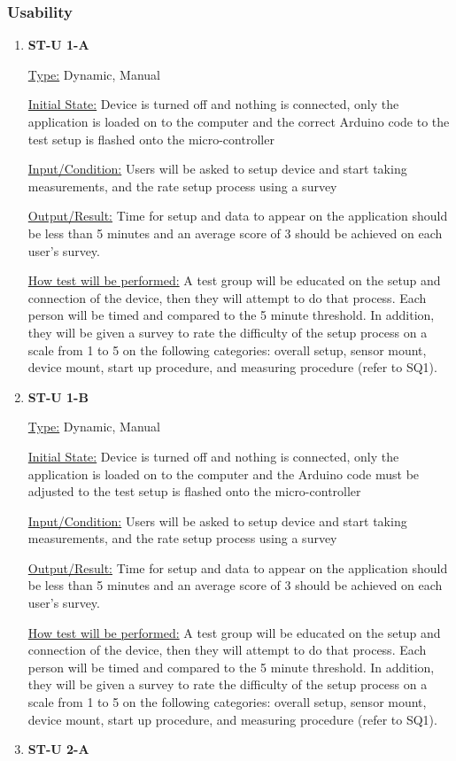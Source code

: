 \documentclass[12pt, titlepage]{article}
\begin{document}
\subsubsection{Usability}

\begin{enumerate}
\item{\bf{ST-U 1-A}}

\underline{Type:} Dynamic, Manual
          
\underline{Initial State:} Device is turned off and nothing is connected, only the application is loaded on to the computer and the correct Arduino code to the test setup is flashed onto the micro-controller
          
\underline{Input/Condition:} Users will be asked to setup device and start taking measurements, and the rate setup process using a survey
          
\underline{Output/Result:} Time for setup and data to appear on the application should be less than 5 minutes and an average score of 3 should be achieved on each user's survey.
          
\underline{How test will be performed:} A test group will be educated on the setup and connection of the device, then they will attempt to do that process. 
Each person will be timed and compared to the 5 minute threshold. In addition, they will be given a survey to rate the difficulty of the setup process on a scale from 
1 to 5 on the following categories: overall setup, sensor mount, device mount, start up procedure, and measuring procedure (refer to SQ1).  
\item{\bf{ST-U 1-B}}

\underline{Type:} Dynamic, Manual
          
\underline{Initial State:} Device is turned off and nothing is connected, only the application is loaded on to the computer and the Arduino code must be adjusted to the test setup is flashed onto the micro-controller
          
\underline{Input/Condition:} Users will be asked to setup device and start taking measurements, and the rate setup process using a survey
          
\underline{Output/Result:} Time for setup and data to appear on the application should be less than 5 minutes and an average score of 3 should be achieved on each user's survey.
          
\underline{How test will be performed:} A test group will be educated on the setup and connection of the device, then they will attempt to do that process. 
Each person will be timed and compared to the 5 minute threshold. In addition, they will be given a survey to rate the difficulty of the setup process on a scale from 
1 to 5 on the following categories: overall setup, sensor mount, device mount, start up procedure, and measuring procedure (refer to SQ1).  
\newpage
\item{\bf{ST-U 2-A}}


\end{enumerate}
\end{document}

